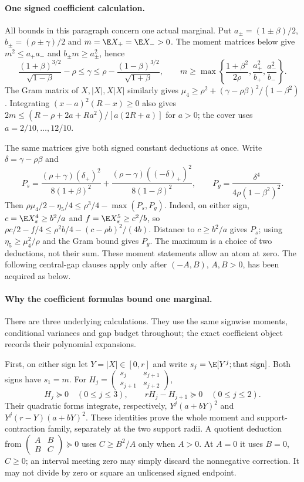 \paragraph{One signed coefficient calculation.}
\label{j:local:atlas}\label{j:local:moments}
All bounds in this paragraph concern one actual marginal. Put
$a_\pm=(1\pm\beta)/2$, $b_\pm=(\rho\pm\gamma)/2$ and
$m=\E X_+=\E X_->0$. The moment matrices below give
$m^2\le a_+a_-$ and $b_\pm m\ge a_\pm^2$, hence
\[
 \frac{(1+\beta)^{3/2}}{\sqrt{1-\beta}}-\rho\le\gamma
 \le\rho-\frac{(1-\beta)^{3/2}}{\sqrt{1+\beta}},\qquad
 m\ge\max\left\{\frac{1+\beta^2}{2\rho},\frac{a_+^2}{b_+},\frac{a_-^2}{b_-}\right\}.
\]
The Gram matrix of $X,|X|,X|X|$ similarly gives
$\mu_4\ge\rho^2+(\gamma-\rho\beta)^2/(1-\beta^2)$.
Integrating $(x-a)^2(R-x)\ge0$ also gives
$2m\le(R-\rho+2a+Ra^2)/[a(2R+a)]$ for $a>0$; the cover uses
$a=2/10,\ldots,12/10$.

The same matrices give both signed constant deductions at once.
Write $\delta=\gamma-\rho\beta$ and
\[
 P_s=\frac{(\rho+\gamma)(\delta_+)^2}{8(1+\beta)^2}
       +\frac{(\rho-\gamma)((-\delta)_+)^2}{8(1-\beta)^2},\qquad
 P_g=\frac{\delta^4}{4\rho(1-\beta^2)^2}.
\]
Then $\rho\mu_4/2-\eta_5/4\le\rho^3/4-\max(P_s,P_g)$.
Indeed, on either sign, $c=\E X_s^4\ge b^2/a$ and
$f=\E X_s^5\ge c^2/b$, so
$\rho c/2-f/4\le\rho^2b/4-(c-\rho b)^2/(4b)$.
Distance to $c\ge b^2/a$ gives $P_s$; using
$\eta_5\ge\mu_4^2/\rho$ and the Gram bound gives $P_g$.
The maximum is a choice of two deductions, not their sum.
These moment statements allow an atom at zero. The following central-gap
clauses apply only after $(-A,B)$, $A,B>0$, has been acquired as below.

\paragraph{Why the coefficient formulas bound one marginal.}
There are three underlying calculations. They use the same signwise
moments, conditional variances and gap budget throughout; the exact
coefficient object records their polynomial expansions.

First, on either sign let $Y=|X|\in[0,r]$ and write
$s_j=\E[Y^j;\text{that sign}]$. Both signs have $s_1=m$.
For $H_j=\left(\begin{smallmatrix}s_j&s_{j+1}\\s_{j+1}&s_{j+2}\end{smallmatrix}\right)$,
\[
 H_j\succeq0\quad(0\le j\le3),\qquad
 rH_j-H_{j+1}\succeq0\quad(0\le j\le2).
\]
Their quadratic forms integrate, respectively,
$Y^j(a+bY)^2$ and $Y^j(r-Y)(a+bY)^2$. These identities prove the
whole moment and support-contraction family, separately at the two
support radii. A quotient deduction from
$\left(\begin{smallmatrix}A&B\\B&C\end{smallmatrix}\right)\succeq0$
uses $C\ge B^2/A$ only when $A>0$. At $A=0$ it uses $B=0$, $C\ge0$;
an interval meeting zero may simply discard the nonnegative correction.
It may not divide by zero or square an unlicensed signed endpoint.

